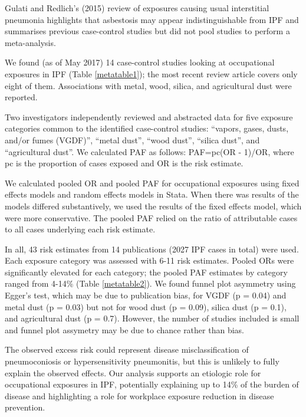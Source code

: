 \documentclass[a4paper,10pt]{article}
\begin{document}
Gulati and Redlich’s (2015) review of exposures causing usual interstitial pneumonia highlights that asbestosis may appear indistinguishable from IPF and summarises previous case-control studies but did not pool studies to perform a meta-analysis.\cite{Gulati2015}

We found (as of May 2017) 14 case-control studies looking at occupational exposures in IPF (Table \ref{metatable1}); the most recent review article covers only eight of them.  Associations with metal, wood, silica, and agricultural dust were reported. \cite{Scott1990, Iwai1994, Hubbard1996a, Mullen1998, Baumgartner2000, Miyake2005, Gustafson2007, Garcia-SanchoFigueroa2010, Garcia-Sancho2011, Awadalla2012, Paolocci2013, Koo2017}     

Two investigators independently reviewed and abstracted data for five exposure categories
common to the identified case-control studies: “vapors, gases, dusts, and/or fumes (VGDF)”, “metal dust”, “wood dust”, “silica dust”, and “agricultural dust”. We calculated PAF as follows: PAF=pc(OR - 1)/OR, where pc is the proportion of cases exposed and OR is the risk estimate.  

We calculated pooled OR and pooled PAF for occupational exposures using fixed effects models and  random effects models in Stata. When there was  results of the models differed substantively, we used the results of the fixed effects model, which were more conservative. The pooled PAF relied on the ratio of attributable cases to all cases underlying each risk estimate.

In all, 43 risk estimates from 14 publications (2027 IPF cases in total) were used. Each exposure category was assessed with 6-11 risk estimates. Pooled ORs were significantly elevated for each category; the pooled PAF estimates by category ranged from 4-14\% (Table \ref{metatable2}). We found funnel plot asymmetry using Egger's test, which may be due to publication bias, for VGDF (p = 0.04) and metal dust (p = 0.03) but not for wood dust (p = 0.09), silica dust (p = 0.1), and agricultural dust (p = 0.7). However, the number of studies included is small and funnel plot assymetry may be due to chance rather than bias.

The observed excess risk could represent disease misclassification of pneumoconiosis or hypersensitivity pneumonitis, but this is unlikely to fully explain the observed effects. Our analysis supports an etiologic role for occupational exposures in IPF, potentially explaining up to 14\% of the burden of disease and highlighting a role for workplace exposure reduction in disease prevention.
\end{document}

